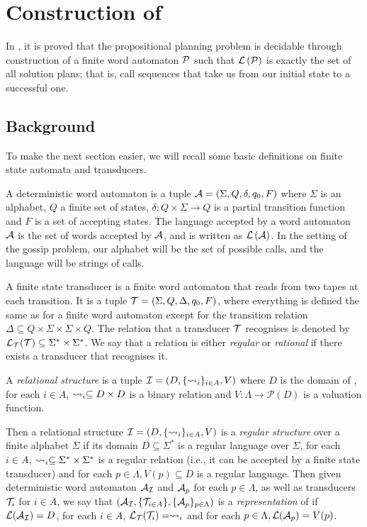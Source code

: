 \documentclass[12pt, a4paper]{article} %
\begin{document}
\section{Construction of }

In \cite{Aucher:2014}, it is proved that the propositional planning problem is decidable through construction of a finite word automaton $\mathcal{P}$ such that $\mathcal{L}\left(\mathcal{P}\right)$ is exactly the set of all solution plans; that is, call sequences that take us from our initial state to a successful one. 

\subsection{Background}

To make the next section easier, we will recall some basic definitions on finite state automata and transducers. 

A deterministic word automaton is a tuple $\mathcal{A} = \left(\Sigma, Q, \delta, q_0, F\right)$ where $\Sigma$ is an alphabet, $Q$ a finite set of states, $\delta : Q \times \Sigma \rightarrow Q$ is a partial transition function and $F$ is a set of accepting states. The language accepted by a word automaton $\mathcal{A}$ is the set of words accepted by $\mathcal{A}$, and is written as $\mathcal{L}\left(\mathcal{A}\right)$. In the setting of the gossip problem, our alphabet will be the set of possible calls, and the language will be strings of calls. 

A finite state transducer is a finite word automaton that reads from two tapes at each transition. It is a tuple $\mathcal{T} = \left(\Sigma, Q, \Delta, q_0, F\right)$, where everything is defined the same as for a finite word automaton except for the transition relation $\Delta \subseteq Q \times \Sigma \times \Sigma \times Q$. The relation that a transducer $\mathcal{T}$ recognises is denoted by $\mathcal{L}_{\mathcal{T}}(\mathcal{T}) \subseteq \Sigma^\ast \times \Sigma^\ast$. We say that a relation is either \textit{regular} or \textit{rational} if there exists a transducer that recognises it.

A \textit{relational structure} is a tuple $\mathcal{I} = \left(D, \{\rightsquigarrow_i\}_{i \in A}, V\right)$ where $D$ is the domain of , for each $i \in A$, $\rightsquigarrow_i \subseteq D \times D$ is a binary relation and $V : \Lambda \rightarrow \mathcal{P}(D)$ is a valuation function.

Then a relational structure $\mathcal{I} = \left(D, \{\rightsquigarrow_i\}_{i \in A}, V\right)$ is a \textit{regular structure} over a finite alphabet $\Sigma$ if its domain $D \subseteq \Sigma^\ast$ is a regular language over $\Sigma$, for each $i \in A$, $\rightsquigarrow_i \subseteq \Sigma^\ast \times \Sigma^\ast$ is a regular relation (i.e., it can be accepted by a finite state transducer) and for each $p \in \Lambda, V(p) \subseteq D$ is a regular language. Then given deterministic word automaton $\mathcal{A}_{\mathcal{I}}$ and $\mathcal{A}_p$ for each $p \in \Lambda$, as well as transducers $\mathcal{T}_i$ for $i \in A$, we say that $\left(\mathcal{A}_{\mathcal{I}}, \{\mathcal{T}_{i \in A}\}, \{\mathcal{A}_p\}_{p \in \Lambda}\right)$ is a \textit{representation} of  if $\mathcal{L(A_I)} = D$, for each $i \in A$, $\mathcal{L}_{\mathcal{T}}(\mathcal{T}_i) = \rightsquigarrow_i$ and for each $p \in \Lambda, \mathcal{L}(\mathcal{A}_p) = V(p)$.
\end{document}
